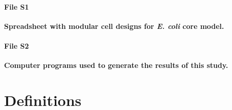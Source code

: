 \paragraph{File S1}
\textbf{Spreadsheet with modular cell designs for \textit{E. coli} core model.}

\paragraph{File S2}
\textbf{Computer programs used to generate the results of this study.}






%


\section{Definitions} \label{sec:definitions}
